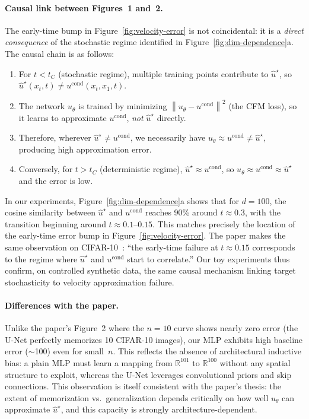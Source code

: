 \documentclass[10pt,a4paper]{article}
\theoremstyle{definition}
\newcommand{\R}{\mathbb{R}}
\newcommand{\norm}[1]{\left\lVert #1 \right\rVert}
\begin{document}
\paragraph{Causal link between Figures~1 and~2.}
The early-time bump in Figure~\ref{fig:velocity-error} is not coincidental: it is a \emph{direct consequence} of the stochastic regime identified in Figure~\ref{fig:dim-dependence}a.
The causal chain is as follows:
\begin{enumerate}[nosep,leftmargin=1.5em]
    \item For $t < t_C$ (stochastic regime), multiple training points contribute to $\hat{u}^\star$, so $\hat{u}^\star(x_t, t) \neq u^{\mathrm{cond}}(x_t, x_1, t)$.
    \item The network $u_\theta$ is trained by minimizing $\norm{u_\theta - u^{\mathrm{cond}}}^2$ (the CFM loss), so it learns to approximate $u^{\mathrm{cond}}$, \emph{not} $\hat{u}^\star$ directly.
    \item Therefore, wherever $\hat{u}^\star \neq u^{\mathrm{cond}}$, we necessarily have $u_\theta \approx u^{\mathrm{cond}} \neq \hat{u}^\star$, producing high approximation error.
    \item Conversely, for $t > t_C$ (deterministic regime), $\hat{u}^\star \approx u^{\mathrm{cond}}$, so $u_\theta \approx u^{\mathrm{cond}} \approx \hat{u}^\star$ and the error is low.
\end{enumerate}
In our experiments, Figure~\ref{fig:dim-dependence}a shows that for $d = 100$, the cosine similarity between $\hat{u}^\star$ and $u^{\mathrm{cond}}$ reaches 90\% around $t \approx 0.3$, with the transition beginning around $t \approx 0.1$--$0.15$.
This matches precisely the location of the early-time error bump in Figure~\ref{fig:velocity-error}.
The paper makes the same observation on CIFAR-10~\cite[Section~3.2]{bertrand2025closed}: ``the early-time failure at $t \approx 0.15$ corresponds to the regime where $\hat{u}^\star$ and $u^{\mathrm{cond}}$ start to correlate.''
Our toy experiments thus confirm, on controlled synthetic data, the same causal mechanism linking target stochasticity to velocity approximation failure.

\paragraph{Differences with the paper.}
Unlike the paper's Figure~2 where the $n = 10$ curve shows nearly zero error (the U-Net perfectly memorizes 10 CIFAR-10 images), our MLP exhibits high baseline error (${\sim}$100) even for small~$n$.
This reflects the absence of architectural inductive bias: a plain MLP must learn a mapping from $\R^{101}$ to $\R^{100}$ without any spatial structure to exploit, whereas the U-Net leverages convolutional priors and skip connections.
This observation is itself consistent with the paper's thesis: the extent of memorization vs.\ generalization depends critically on how well $u_\theta$ can approximate $\hat{u}^\star$, and this capacity is strongly architecture-dependent.
\end{document}
